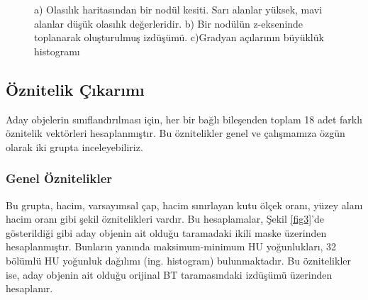 \documentclass[conference]{IEEEtran}
\begin{document}
\begin{figure}[t]
\centering
{}
\caption{a) Olasılık haritasından bir nodül kesiti. Sarı alanlar yüksek, mavi alanlar düşük olasılık değerleridir. b) Bir nodülün z-ekseninde toplanarak oluşturulmuş izdüşümü. c)Gradyan açılarının büyüklük histogramı}
\label{fig2}
\end{figure}

\subsection{Öznitelik Çıkarımı}\label{oznitelik}
Aday objelerin sınıflandırılması için, her bir bağlı bileşenden toplam 18 adet farklı öznitelik vektörleri hesaplanmıştır. Bu öznitelikler genel ve çalışmamıza özgün olarak iki grupta inceleyebiliriz.

\subsubsection{Genel Öznitelikler}
Bu grupta, hacim, varsayımsal çap, hacim sınırlayan kutu ölçek oranı, yüzey alanı hacim oranı gibi şekil öznitelikleri vardır. Bu hesaplamalar, Şekil \ref{fig3}'de gösterildiği gibi aday objenin ait olduğu taramadaki ikili maske üzerinden hesaplanmıştır. Bunların yanında maksimum-minimum HU yoğunlukları, 32 bölümlü HU yoğunluk dağılımı (ing. histogram) bulunmaktadır. Bu öznitelikler ise, aday objenin ait olduğu orijinal BT taramasındaki izdüşümü üzerinden hesaplanır.
\end{document}
